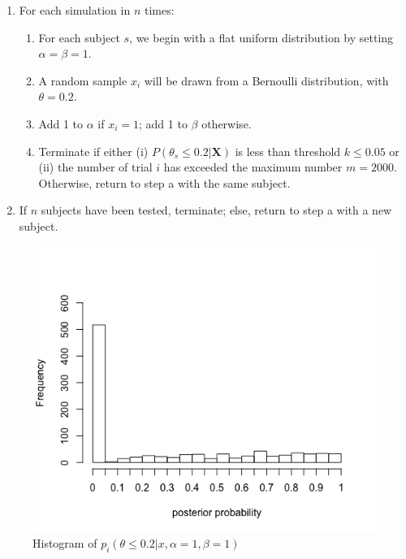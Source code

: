 \begin{enumerate}
\def\labelenumi{\arabic{enumi}.}
\tightlist
\item
  For each simulation in \(n\) times:

  \begin{enumerate}
  \def\labelenumii{\alph{enumii}.}
  \tightlist
  \item
    For each subject \(s\), we begin with a flat uniform distribution by
    setting \(\alpha = \beta = 1\).
  \item
    A random sample \(x_i\) will be drawn from a Bernoulli distribution,
    with \(\theta = 0.2\).
  \item
    Add 1 to \(\alpha\) if \(x_i =1\); add 1 to \(\beta\) otherwise.
  \item
    Terminate if either (i) \(P(\theta_s \leq 0.2|\mathbf{X})\) is less
    than threshold \(k\leq 0.05\) or (ii) the number of trial \(i\) has exceeded
    the maximum number \(m=2000\). Otherwise, return to step a with the same
    subject.
  \end{enumerate}
\item
  If \(n\) subjects have been tested, terminate; else, return to step a
  with a new subject.

\end{enumerate}



\begin{figure}[h] 
\begin{center}
\includegraphics[scale=0.7]{Bayesstopflatallpost.png}
	\caption{Histogram of $p_i(\theta\leq 0.2|x,\alpha=1, \beta=1)$}
	\label{fig:bayesflatposterior}
\end{center}	
\end{figure}

